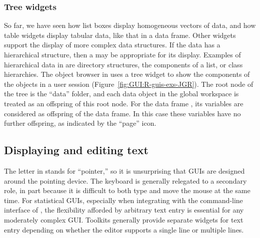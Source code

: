     

\subsubsection{Tree widgets}
\label{sec:GUI:tree-widgets}

So far, we have seen how list boxes display homogeneous vectors of
data, and how table widgets display tabular data, like that in a data
frame. Other widgets support the display of more complex data
structures. If the data has a hierarchical structure, then a  may be appropriate for its display. Examples of hierarchical
data in \R\/ are directory structures, the components of a list, or
class hierarchies. The object browser in  uses a tree widget
to show the components of the objects in a user session
(Figure~\ref{fig:GUI:R-guis-exs-JGR}). The root node of the tree is
the ``data'' folder, and each data object in the global workspace is
treated as an offspring of this root node. For the data frame
, its variables are considered as offspring of the data
frame. In this case these variables have no further offspring, as
indicated by the ``page'' icon.

\subsection{Displaying and editing text}
\label{sec:GUI:text-widgets}

The letter  in  stands for ``pointer,'' so it
is unsurprising that  GUIs are designed around the
pointing device. The keyboard is generally relegated to a secondary
role, in part because it is difficult to both type and move the mouse
at the same time. For statistical GUIs, especially when integrating
with the command-line interface of \R\/, the flexibility afforded by
arbitrary text entry is essential for any moderately complex
GUI. Toolkits generally provide separate widgets for text entry
depending on whether the editor supports a single line or multiple
lines.

